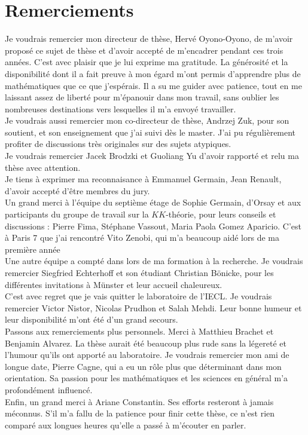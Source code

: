 \section*{Remerciements}

Je voudrais remercier mon directeur de thèse, Hervé Oyono-Oyono, de m'avoir proposé ce sujet de thèse et d'avoir accepté de m'encadrer pendant ces trois années. C'est avec plaisir que je lui exprime ma gratitude. La générosité et la disponibilité dont il a fait preuve à mon égard m'ont permis d'apprendre plus de mathématiques que ce que j'espérais. Il a su me guider avec patience, tout en me laissant assez de liberté pour m'épanouir dans mon travail, sans oublier les nombreuses destinations vers lesquelles il m'a envoyé travailler. \\

Je voudrais aussi remercier mon co-directeur de thèse, Andrzej Zuk, pour son soutient, et son enseignement que j'ai suivi dès le master. J'ai pu régulièrement profiter de discussions très originales sur des sujets atypiques.\\

Je voudrais remercier Jacek Brodzki et Guoliang Yu d'avoir rapporté et relu ma thèse avec attention. \\

Je tiens à exprimer ma reconnaisance à Emmanuel Germain, Jean Renault, d'avoir accepté d'être membres du jury.\\   

Un grand merci à l'équipe du septième étage de Sophie Germain, d'Orsay et aux participants du groupe de travail sur la $KK$-théorie, pour leurs conseils et discussions : Pierre Fima, Stéphane Vassout, Maria Paola Gomez Aparicio. C'est à Paris 7 que j'ai rencontré Vito Zenobi, qui m'a beaucoup aidé lors de ma première année \\

Une autre équipe a compté dans lors de ma formation à la recherche. Je voudrais remercier Siegfried Echterhoff et son étudiant Christian Bönicke, pour les différentes invitations à Münster et leur accueil chaleureux.\\

C'est avec regret que je vais quitter le laboratoire de l'IECL. Je voudrais remercier Victor Nistor, Nicolas Prudhon et Salah Mehdi. Leur bonne humeur et leur disponibilité m'ont été d'un grand secours. \\

Passons aux remerciements plus personnels. Merci à Matthieu Brachet et Benjamin Alvarez. La thèse aurait été beaucoup plus rude sans la légereté et l'humour qu'ils ont apporté au laboratoire. Je voudrais remercier mon ami de longue date, Pierre Cagne, qui a eu un rôle plus que déterminant dans mon orientation. Sa passion pour les mathématiques et les sciences en général m'a profondément influencé. \\

Enfin, un grand merci à Ariane Constantin. Ses efforts resteront à jamais méconnus. S'il m'a fallu de la patience pour finir cette thèse, ce n'est rien comparé aux longues heures qu'elle a passé à m'écouter en parler.   


